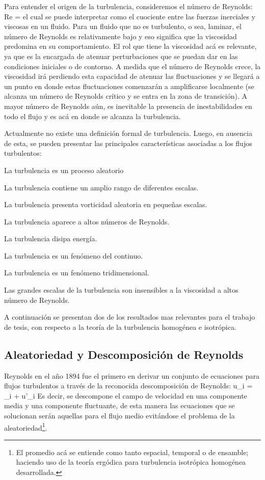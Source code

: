 Para entender el origen de la turbulencia, consideremos el número de Reynolds:
\be Re = \ee
el cual se puede interpretar como el cuociente entre las fuerzas inerciales y viscosas en un fluido. Para un fluido que no es turbulento, o sea, laminar, el número de Reynolds es relativamente bajo y eso significa que la viscosidad predomina en su comportamiento. El rol que tiene la viscosidad acá es relevante, ya que es la encargada de atenuar perturbaciones que se puedan dar en las condiciones iniciales o de contorno. A medida que el número de Reynolds crece, la viscosidad irá perdiendo esta capacidad de atenuar las fluctuaciones y se llegará a un punto en donde estas fluctuaciones comenzarán a amplificarse localmente (se alcanza un número de Reynolds crítico y se entra en la zona de transición). A mayor número de Reynolds aún, es inevitable la presencia de inestabilidades en todo el flujo y es acá en donde se alcanza la turbulencia.

Actualmente no existe una definición formal de turbulencia. Luego, en ausencia de esta, se pueden presentar las principales características asociadas a los flujos turbulentos:
\begin{itemize*}
	\item La turbulencia es un proceso aleatorio
	\item La turbulencia contiene un amplio rango de diferentes escalas.
	\item La turbulencia presenta vorticidad aleatoria en pequeñas escalas.
	\item La turbulencia aparece a altos números de Reynolds.
	\item La turbulencia disipa energía.
	\item La turbulencia es un fenómeno del continuo.
	\item La turbulencia es un fenómeno tridimensional.
	\item Las grandes escalas de la turbulencia son insensibles a la viscosidad a altos número de Reynolds.
\end{itemize*}

A continuación se presentan dos de los resultados mas relevantes para el trabajo de tesis, con respecto a la teoría de la turbulencia homogénea e isotrópica.
\subsection{Aleatoriedad y Descomposición de Reynolds}
Reynolds en el año 1894 fue el primero en derivar un conjunto de ecuaciones para flujos turbulentos a través de la reconocida descomposición de Reynolds:
\be u_i = _i + u'_i \ee
Es decir, se descompone el campo de velocidad en una componente media y una componente fluctuante, de esta manera las ecuaciones que se solucionan serán aquellas para el flujo medio evitándose el problema de la aleatoriedad\footnote{El promedio acá se entiende como tanto espacial, temporal o de ensamble; haciendo uso de la teoría ergódica para turbulencia isotrópica homogénea desarrollada.}.

